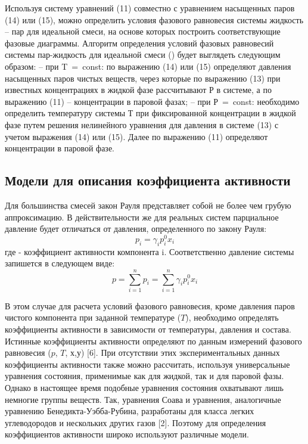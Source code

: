 Используя систему уравнений (11) совместно с уравнением насыщенных паров (14) или (15), можно определить условия фазового равновесия системы жидкость – пар для идеальной смеси, на основе которых построить соответствующие фазовые диаграммы. 
Алгоритм определения условий фазовых равновесий системы пар-жидкость для идеальной смеси () будет выглядеть следующим образом:
– при T = const: по выражению (14) или (15) определяют давления насыщенных паров чистых веществ, через которые по выражению (13) при известных концентрациях в жидкой фазе рассчитывают Р в системе, а по выражению (11) – концентрации в паровой фазах;
– при Р = const: необходимо определить температуру системы Т при фиксированной концентрации в жидкой фазе путем решения нелинейного уравнения для давления в системе (13) с учетом выражения (14) или (15). Далее по выражению (11) определяют концентрации в паровой фазе.



\subsection*{Модели для описания коэффициента активности}
Для большинства смесей закон Рауля представляет собой не более чем грубую аппроксимацию. В действительности же для реальных систем парциальное давление будет отличаться от давления, определенного по закону Рауля:
\begin{equation}
	p_i=\gamma_i p_i^0 x_i
\end{equation}
где  - коэффициент активности компонента i. Соответственно давление системы запишется в следующем виде:
\begin{equation}
	p=\sum\limits_{i=1}^{n} p_i=\sum\limits_{i=1}^{n} \gamma_i p_i^0 x_i
\end{equation}

В этом случае для расчета условий фазового равновесия, кроме давления паров чистого компонента при заданной температуре ($T$), необходимо определять коэффициенты активности в зависимости от температуры, давления и состава.
Истинные коэффициенты активности определяют по данным измерений фазового равновесия ($p$, $T$, $х$,$ у$) [6]. При отсутствии этих экспериментальных данных коэффициенты активности также можно рассчитать, используя универсальные уравнения состояния, применимые как для жидкой, так и для паровой фазы. Однако в настоящее время подобные уравнения состояния охватывают лишь немногие группы веществ. Так, уравнения Соава и уравнения, аналогичные уравнению Бенедикта-Уэбба-Рубина, разработаны для класса легких углеводородов и нескольких других газов [2]. Поэтому для определения коэффициентов активности широко используют различные модели.

